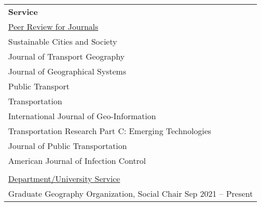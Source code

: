 \documentclass[letterpaper, 11pt]{article}
\begin{document}
\begin{longtable}{p{6.5in}}
\textbf{Service}\\
\underline{Peer Review for Journals}\\
Sustainable Cities and Society \\
Journal of Transport Geography \\
Journal of Geographical Systems \\
Public Transport \\
Transportation \\
International Journal of Geo-Information \\
Transportation Research Part C: Emerging Technologies \\ 
Journal of Public Transportation \\ 
American Journal of Infection Control \\\\


\underline{Department/University Service}\\
Graduate Geography Organization, Social Chair \hfill Sep 2021 -- Present\\


\end{longtable}
\end{document}
